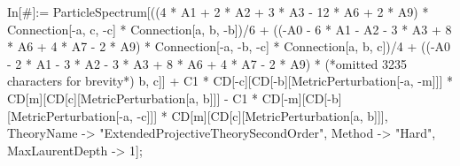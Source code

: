 In[\#]:= ParticleSpectrum[((4 * A1 + 2 * A2 + 3 * A3 - 12 * A6 + 2 * A9) * Connection[-a, c, -c] * Connection[a, b, -b])/6 + ((-A0 - 6 * A1 - A2 - 3 * A3 + 8 * A6 + 4 * A7 - 2 * A9) * Connection[-a, -b, -c] * Connection[a, b, c])/4 + ((-A0 - 2 * A1 - 3 * A2 - 3 * A3 + 8 * A6 + 4 * A7 - 2 * A9) * (*omitted 3235 characters for brevity*) b, c]] + C1 * CD[-c][CD[-b][MetricPerturbation[-a, -m]]] * CD[m][CD[c][MetricPerturbation[a, b]]] - C1 * CD[-m][CD[-b][MetricPerturbation[-a, -c]]] * CD[m][CD[c][MetricPerturbation[a, b]]], TheoryName -> "ExtendedProjectiveTheorySecondOrder", Method -> "Hard", MaxLaurentDepth -> 1];